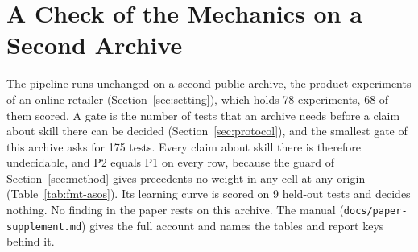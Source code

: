\section{A Check of the Mechanics on a Second Archive}\label{sec:asos-results}\label{app:asos}
The pipeline runs unchanged on a second public archive, the product experiments of an online retailer (Section~\ref{sec:setting}), which holds 78 experiments, 68 of them scored.
A gate is the number of tests that an archive needs before a claim about skill there can be decided (Section~\ref{sec:protocol}), and the smallest gate of this archive asks for 175 tests. Every claim about skill there is therefore undecidable, and P2 equals P1 on every row, because the guard of Section~\ref{sec:method} gives precedents no weight in any cell at any origin (Table~\ref{tab:fmt-asos}).
Its learning curve is scored on 9 held-out tests and decides nothing.
No finding in the paper rests on this archive. The manual (\texttt{docs/paper-supplement.md}) gives the full account and names the tables and report keys behind it.

\begin{table}[t]\centering\scriptsize
\caption{The retailer's archive, pooled across its nominal origins and its metric cells. Each row carries one figure. The adjusted interval is for the 55 intervals in the archive's pooled table, which the build writes to \texttt{paper/tables/main-asos.tex} and this paper does not print. The percentile for calibration is computed against the clustered null, and the design effect measures how much the variance grows because the contrasts of a single test move together, which the null reproduces. The archive is undecidable, so no figure here is read as a finding.}
\label{tab:fmt-asos}
\resizebox{\columnwidth}{!}{}
\end{table}
